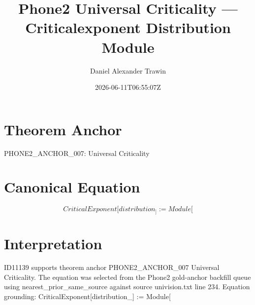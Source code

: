 \documentclass[11pt]{article}
\title{Phone2 Universal Criticality — Criticalexponent Distribution Module}
\author{Daniel Alexander Trawin}
\date{2026-06-11T06:55:07Z}
\begin{document}
\maketitle
\section*{Theorem Anchor}
PHONE2_ANCHOR_007: Universal Criticality
\section*{Canonical Equation}
\[
CriticalExponent[distribution_] := Module[
\]
\section*{Interpretation}
ID11139 supports theorem anchor PHONE2_ANCHOR_007 Universal Criticality. The equation was selected from the Phone2 gold-anchor backfill queue using nearest_prior_same_source against source univision.txt line 234. Equation grounding: CriticalExponent[distribution_] := Module[
\end{document}
